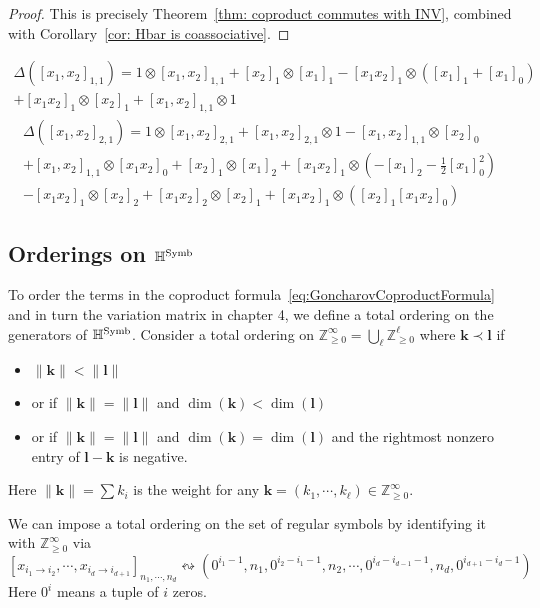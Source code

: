 \begin{proof}
This is precisely Theorem~\ref{thm: coproduct commutes with INV}, combined with Corollary~\ref{cor: Hbar is coassociative}.
\end{proof}

\begin{example}
\begin{multline}
\Delta([x_1,x_2]_{1,1})=1\otimes[x_1,x_2]_{1,1}+[x_2]_1\otimes[x_1]_1-[x_1x_2]_1\otimes([x_1]_1+[x_1]_0)\\
+[x_1x_2]_1\otimes[x_2]_1+[x_1,x_2]_{1,1}\otimes1
\end{multline}
\begin{multline}
\Delta([x_1,x_2]_{2,1})=1\otimes [x_1,x_2]_{2,1}+[x_1,x_2]_{2,1}\otimes 1-[x_1,x_2]_{1,1}\otimes [x_2]_0\\
+[x_1,x_2]_{1,1}\otimes[x_1 x_2]_0+[x_2]_1\otimes[x_1]_2+[x_1x_2]_1\otimes\left(-[x_1]_2-\frac{1}{2}[x_1]_0^2\right)\\
-[x_1x_2]_1\otimes[x_2]_2+[x_1x_2]_2\otimes [x_2]_1+[x_1x_2]_1\otimes\left([x_2]_1[x_1 x_2]_0\right)
\end{multline}
\end{example}

\subsection{Orderings on $\mathbb H^{\operatorname{Symb}}$}\label{sec: multiple polylog ordering}

To order the terms in the coproduct formula~\ref{eq:GoncharovCoproductFormula} and in turn the variation matrix in chapter 4, we define a total ordering on the generators of $\mathbb H^{\operatorname{Symb}}$. Consider a total ordering on $\mathbb Z_{\geq0}^\infty=\bigcup_{\ell}\mathbb Z_{\geq0}^\ell$ where $\mathbf k\prec\mathbf l$ if
\begin{itemize}
\item $\|\mathbf k\|<\|\mathbf l\|$
\item or if $\|\mathbf k\|=\|\mathbf l\|$ and $\dim(\mathbf k)<\dim(\mathbf l)$
\item or if $\|\mathbf k\|=\|\mathbf l\|$ and $\dim(\mathbf k)=\dim(\mathbf l)$ and the rightmost nonzero entry of $\mathbf l-\mathbf k$ is negative.
\end{itemize}
Here $\|\mathbf k\|=\sum k_i$ is the weight for any $\mathbf k=(k_1,\cdots,k_\ell)\in\mathbb Z_{\geq0}^\infty$.

\begin{definition}\label{def: order on polylog}
We can impose a total ordering on the set of regular symbols by identifying it with $\mathbb Z^\infty_{\geq0}$ via
\[
[x_{i_1\to i_2},\cdots,x_{i_d\to i_{d+1}}]_{n_1,\cdots,n_d}\leftrightsquigarrow(0^{i_1-1},n_1,0^{i_2-i_1-1},n_2,\cdots,0^{i_d-i_{d-1}-1},n_d,0^{i_{d+1}-i_d-1})
\]
Here $0^i$ means a tuple of $i$ zeros.
\end{definition}

